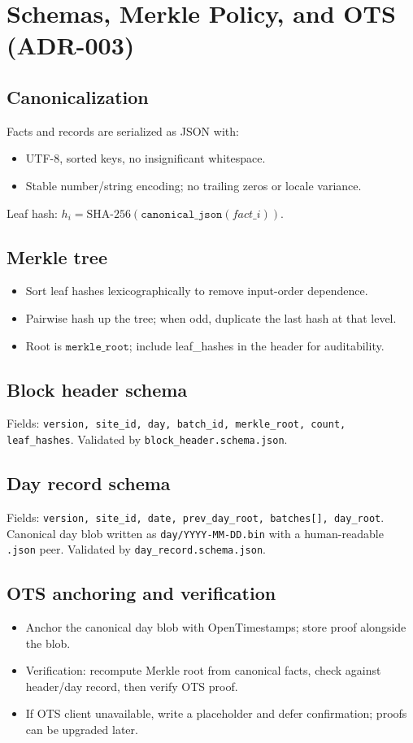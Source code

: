 \section{Schemas, Merkle Policy, and OTS (ADR-003)}

\subsection{Canonicalization}
Facts and records are serialized as JSON with:
\begin{itemize}[nosep]
  \item UTF-8, sorted keys, no insignificant whitespace.
  \item Stable number/string encoding; no trailing zeros or locale variance.
\end{itemize}
Leaf hash: $h_i=\mathrm{SHA}\text{-}256(\texttt{canonical\_json}(fact\_i))$.

\subsection{Merkle tree}
\begin{itemize}[nosep]
  \item Sort leaf hashes lexicographically to remove input-order dependence.
  \item Pairwise hash up the tree; when odd, duplicate the last hash at that level.
  \item Root is $\texttt{merkle\_root}$; include leaf\_hashes in the header for auditability.
\end{itemize}

\subsection{Block header schema}
Fields: \texttt{version, site\_id, day, batch\_id, merkle\_root, count, leaf\_hashes}.
Validated by \texttt{block\_header.schema.json}.

\subsection{Day record schema}
Fields: \texttt{version, site\_id, date, prev\_day\_root, batches[], day\_root}.
Canonical day blob written as \texttt{day/YYYY-MM-DD.bin} with a human-readable \texttt{.json} peer.
Validated by \texttt{day\_record.schema.json}.

\subsection{OTS anchoring and verification}
\begin{itemize}[nosep]
  \item Anchor the canonical day blob with OpenTimestamps; store proof alongside the blob.
  \item Verification: recompute Merkle root from canonical facts, check against header/day record, then verify OTS proof.
  \item If OTS client unavailable, write a placeholder and defer confirmation; proofs can be upgraded later.
\end{itemize}

